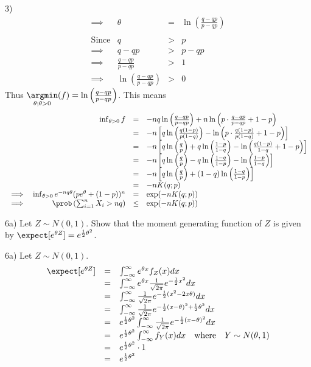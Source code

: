 \documentclass[11pt,a4paper]{article}
\begin{document}
\begin{answer}{3)}
\[\begin{array}{rrcl}
    \implies&\theta&=&\ln\left(\frac{q-qp}{p-qp}\right)\\\\
    \text{Since}&q&>&p\\
    \implies&q-qp&>&p-qp\\
    \implies&\frac{q-qp}{p-qp}&>&1\\
    \implies&\ln\left(\frac{q-qp}{p-qp}\right)&>&0
  \end{array}\]
  Thus $\underset{\theta;\theta>0}\argmin (f)=\ln\left(\frac{q-qp}{p-qp}\right)$. This means
  \[\begin{array}{rrcl}
    &\inf_{\theta>0}f&=&-nq\ln\left(\frac{q-qp}{p-qp}\right)+n\ln\left(p\cdot\frac{q-qp}{p-qp}+1-p\right)\\
    &&=&-n\left[q\ln\left(\frac{q(1-p)}{p(1-q)}\right)-\ln\left(p\cdot\frac{q(1-p)}{p(1-q)}+1-p\right)\right]\\
    &&=&-n\left[q\ln\left(\frac{q}p\right)+q\ln\left(\frac{1-p}{1-q}\right)-\ln\left(\frac{q(1-p)}{1-q}+1-p\right)\right]\\
    &&=&-n\left[q\ln\left(\frac{q}p\right)-q\ln\left(\frac{1-q}{1-p}\right)-\ln\left(\frac{1-p}{1-q}\right)\right]\\
    &&=&-n\left[q\ln\left(\frac{q}p\right)+(1-q)\ln\left(\frac{1-q}{1-p}\right)\right]\\
    &&=&-nK(q;p)\\
    \implies&\inf_{\theta>0}e^{-nq\theta}(pe^\theta+(1-p))^n&=&\exp(-nK(q;p))\\
    \implies&\prob\left(\sum_{i=1}^nX_i>nq\right)&\leq&\exp(-nK(q;p))
  \end{array}\]
\end{answer}

\begin{question}{6a)}
  Let $Z\sim N(0,1)$. Show that the moment generating function of $Z$ is given by $\expect[e^{\theta Z}]=e^{\frac12\theta^2}$.
\end{question}

\begin{answer}{6a)}
  Let $Z\sim N(0,1)$.
  \[\begin{array}{rcl}
    \expect[e^{\theta Z}]&=&\int_{-\infty}^\infty e^{\theta x}f_Z(x)dx\\
    &=&\int_{-\infty}^\infty e^{\theta x}\frac1{\sqrt{2\pi}}e^{-\frac12x^2}dx\\
    &=&\int_{-\infty}^\infty \frac1{\sqrt{2\pi}}e^{-\frac12(x^2-2x\theta)}dx\\
    &=&\int_{-\infty}^\infty \frac1{\sqrt{2\pi}}e^{-\frac12(x-\theta)^2+\frac12\theta^2}dx\\
    &=& e^{\frac12\theta^2}\int_{-\infty}^\infty \frac1{\sqrt{2\pi}}e^{-\frac12(x-\theta)^2}dx\\
    &=& e^{\frac12\theta^2}\int_{-\infty}^\infty f_Y(x)dx\quad\text{where}\quad Y\sim N(\theta,1)\\
    &=& e^{\frac12\theta^2}\cdot1\\
    &=& e^{\frac12\theta^2}
  \end{array}\]
\end{answer}
\end{document}
